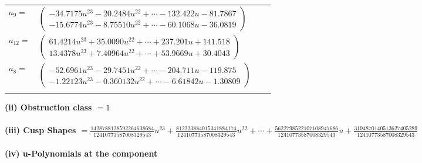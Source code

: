 \documentclass[1p]{elsarticle_modified}
\theoremstyle{definition}
\begin{document}
\begin{tabular}{m{7pt} m{180pt} m{7pt} m{180pt} }
\flushright $a_{9}=$&$\begin{pmatrix}-34.7175 u^{23}-20.2484 u^{22}+\cdots-132.422 u-81.7867\\-15.6774 u^{23}-8.75510 u^{22}+\cdots-60.1068 u-36.0819\end{pmatrix}$ \\
\flushright $a_{12}=$&$\begin{pmatrix}61.4214 u^{23}+35.0090 u^{22}+\cdots+237.201 u+141.518\\13.4378 u^{23}+7.40964 u^{22}+\cdots+53.9669 u+30.4043\end{pmatrix}$ \\
\flushright $a_{8}=$&$\begin{pmatrix}-52.6961 u^{23}-29.7451 u^{22}+\cdots-204.711 u-119.875\\-1.22123 u^{23}-0.360132 u^{22}+\cdots-6.61842 u-1.30809\end{pmatrix}$\\&\end{tabular}
\flushleft \textbf{(ii) Obstruction class $= 1$}\\~\\
\flushleft \textbf{(iii) Cusp Shapes $= \frac{1428788128592264638684}{12410773587008329543} u^{23}+\frac{812223884015341884174}{12410773587008329543} u^{22}+\cdots+\frac{5622798522107108947686}{12410773587008329543} u+\frac{3194870140513627405289}{12410773587008329543}$}\\~\\
\newpage\renewcommand{\arraystretch}{1}
\flushleft \textbf{(iv) u-Polynomials at the component}\newline \\
\end{document}
